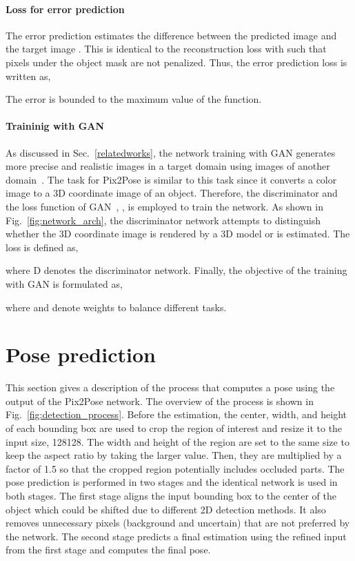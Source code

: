 \documentclass[10pt,twocolumn,letterpaper]{article}
\begin{document}
\paragraph{Loss for error prediction}
The error prediction  estimates the difference between the predicted image  and the target image . This is identical to the reconstruction loss  with  such that pixels under the object mask are not penalized. Thus, the error prediction loss  is written as, 
 
The error is bounded to the maximum value of the  function.


\paragraph{Traininig with GAN} As discussed in Sec.~\ref{relatedworks}, the network training with GAN generates more precise and realistic images in a target domain using images of another domain~\cite{Isola_2017_CVPR_pix2pix}. The task for Pix2Pose is similar to this task since it converts a color image to a 3D coordinate image of an object. Therefore, the discriminator and the loss function of GAN~\cite{goodfellow2014generative}, , is employed to train the network. As shown in Fig.~\ref{fig:network_arch}, the discriminator network attempts to distinguish whether the 3D coordinate image is rendered by a 3D model or is estimated. The loss is defined as, 

where D denotes the discriminator network. Finally, the objective of the training with GAN is formulated as, 
 
where  and  denote weights to balance different tasks. 

\section{Pose prediction} \label{poseprediction}
This section gives a description of the process that computes a pose using the output of the Pix2Pose network. The overview of the process is shown in Fig.~\ref{fig:detection_process}.
Before the estimation, the center, width, and height of each bounding box are used to crop the region of interest and resize it to the input size, 128128. The width and height of the region are set to the same size to keep the aspect ratio by taking the larger value. Then, they are multiplied by a factor of 1.5 so that the cropped region potentially includes occluded parts. The pose prediction is performed in two stages and the identical network is used in both stages. The first stage aligns the input bounding box to the center of the object which could be shifted due to different 2D detection methods. It also removes unnecessary pixels (background and uncertain) that are not preferred by the network. The second stage predicts a final estimation using the refined input from the first stage and computes the final pose.
\end{document}

